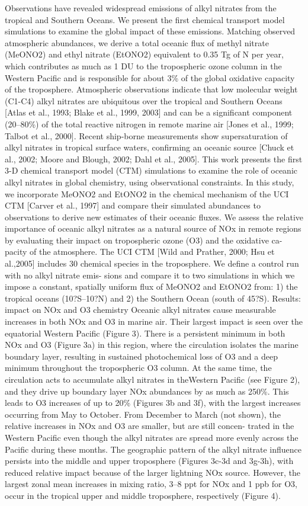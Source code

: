 \documentclass[11pt,a4paper]{article}
\begin{document}
\citep{Neu2008}
Observations have revealed widespread emissions of alkyl nitrates from the tropical and Southern Oceans. We present the first chemical transport model simulations to examine the global impact of these emissions. Matching observed atmospheric abundances, we derive a total oceanic flux of methyl nitrate (MeONO2) and ethyl nitrate (EtONO2) equivalent to 0.35 Tg of N per year, which contributes as much as 1 DU to the tropospheric ozone column in the Western Pacific and is responsible for about 3\% of the global oxidative capacity of the troposphere.
Atmospheric observations indicate that low molecular weight (C1-C4) alkyl nitrates are ubiquitous over the tropical and Southern Oceans [Atlas et al., 1993; Blake et al., 1999, 2003] and can be a significant component (20–80\%) of the total reactive nitrogen in remote marine air [Jones et al., 1999; Talbot et al., 2000]. Recent ship-borne measurements show supersaturation of alkyl nitrates in tropical surface waters, confirming an oceanic source [Chuck et al., 2002; Moore and Blough, 2002; Dahl et al., 2005]. This work presents the first 3-D chemical transport model (CTM) simulations to examine the role of oceanic alkyl nitrates in global chemistry, using observational constraints.
In this study, we incorporate MeONO2 and EtONO2 in the chemical mechanism of the UCI CTM [Carver et al., 1997] and compare their simulated abundances to observations to derive new estimates of their oceanic fluxes. We assess the relative importance of oceanic alkyl nitrates as a natural source of NOx in remote regions by evaluating their impact on tropospheric ozone (O3) and the oxidative ca- pacity of the atmosphere.
The UCI CTM [Wild and Prather, 2000; Hsu et al.,2005] includes 30 chemical species in the troposphere.
We define a control run with no alkyl nitrate emis-
sions and compare it to two simulations in which we impose a constant, spatially uniform flux of MeONO2 and EtONO2 from: 1) the tropical oceans (10?S–10?N) and 2) the Southern Ocean (south of 45?S).
Results: impact on NOx and O3 chemistry
Oceanic alkyl nitrates cause measurable increases in
both NOx and O3 in marine air. Their largest impact is seen over the equatorial Western Pacific (Figure 3). There is a persistent minimum in both NOx and O3 (Figure 3a) in this region, where the circulation isolates the marine boundary layer, resulting in sustained photochemical loss of O3 and a deep minimum throughout the tropospheric O3 column. At the same time, the circulation acts to accumulate alkyl nitrates in theWestern Pacific (see Figure 2), and they drive up boundary layer NOx abundances by as much as 250\%. This leads to O3 increases of up to 20\% (Figures 3b and 3f), with the largest increases occurring from May to October. From December to March (not shown), the relative increases in NOx and O3 are smaller, but are still concen- trated in the Western Pacific even though the alkyl nitrates are spread more evenly across the Pacific during these months. The geographic pattern of the alkyl nitrate influence persists into the middle and upper troposphere (Figures 3c-3d and 3g-3h), with reduced relative impact because of the larger lightning NOx source. However, the largest zonal mean increases in mixing ratio, 3–8 ppt for NOx and 1 ppb for O3, occur in the tropical upper and middle troposphere, respectively (Figure 4).
\end{document}
